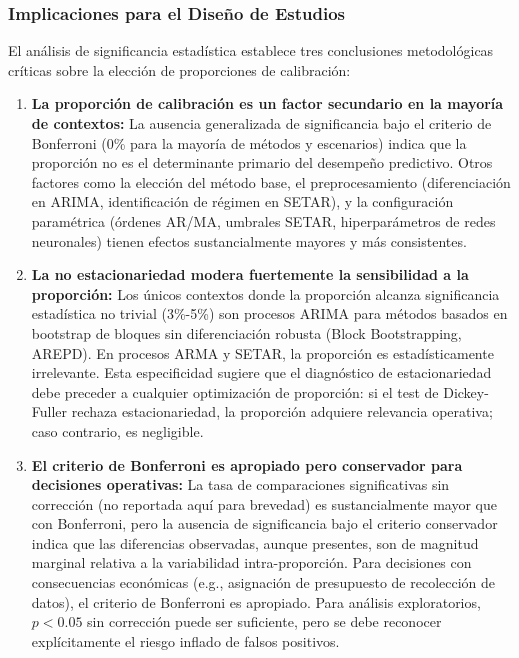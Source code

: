 \subsubsection{Implicaciones para el Diseño de Estudios}

El análisis de significancia estadística establece tres conclusiones metodológicas críticas sobre la elección de proporciones de calibración:

\begin{enumerate}
\item \textbf{La proporción de calibración es un factor secundario en la mayoría de contextos:} La ausencia generalizada de significancia bajo el criterio de Bonferroni (0\% para la mayoría de métodos y escenarios) indica que la proporción no es el determinante primario del desempeño predictivo. Otros factores como la elección del método base, el preprocesamiento (diferenciación en ARIMA, identificación de régimen en SETAR), y la configuración paramétrica (órdenes AR/MA, umbrales SETAR, hiperparámetros de redes neuronales) tienen efectos sustancialmente mayores y más consistentes.

\item \textbf{La no estacionariedad modera fuertemente la sensibilidad a la proporción:} Los únicos contextos donde la proporción alcanza significancia estadística no trivial (3\%-5\%) son procesos ARIMA para métodos basados en bootstrap de bloques sin diferenciación robusta (Block Bootstrapping, AREPD). En procesos ARMA y SETAR, la proporción es estadísticamente irrelevante. Esta especificidad sugiere que el diagnóstico de estacionariedad debe preceder a cualquier optimización de proporción: si el test de Dickey-Fuller rechaza estacionariedad, la proporción adquiere relevancia operativa; caso contrario, es negligible.

\item \textbf{El criterio de Bonferroni es apropiado pero conservador para decisiones operativas:} La tasa de comparaciones significativas sin corrección (no reportada aquí para brevedad) es sustancialmente mayor que con Bonferroni, pero la ausencia de significancia bajo el criterio conservador indica que las diferencias observadas, aunque presentes, son de magnitud marginal relativa a la variabilidad intra-proporción. Para decisiones con consecuencias económicas (e.g., asignación de presupuesto de recolección de datos), el criterio de Bonferroni es apropiado. Para análisis exploratorios, $p < 0.05$ sin corrección puede ser suficiente, pero se debe reconocer explícitamente el riesgo inflado de falsos positivos.
\end{enumerate}

